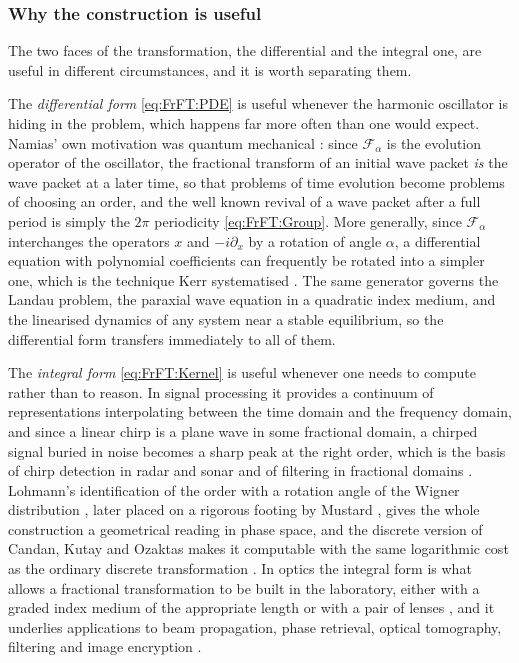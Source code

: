 		\subsubsection{Why the construction is useful}

			The two faces of the transformation, the differential and the integral one, are useful in different circumstances, and it is worth separating them.

			The \emph{differential form} \eqref{eq:FrFT:PDE} is useful whenever the harmonic oscillator is hiding in the problem, which happens far more often than one would expect. Namias' own motivation was quantum mechanical \citep{namias1980fractional}: since $\mathcal{F}_{\alpha}$ is the evolution operator of the oscillator, the fractional transform of an initial wave packet \textit{is} the wave packet at a later time, so that problems of time evolution become problems of choosing an order, and the well known revival of a wave packet after a full period is simply the $2\pi$ periodicity \eqref{eq:FrFT:Group}. More generally, since $\mathcal{F}_{\alpha}$ interchanges the operators $x$ and $-i\partial_{x}$ by a rotation of angle $\alpha$, a differential equation with polynomial coefficients can frequently be rotated into a simpler one, which is the technique Kerr systematised \citep{kerr1988namias}. The same generator governs the Landau problem, the paraxial wave equation in a quadratic index medium, and the linearised dynamics of any system near a stable equilibrium, so the differential form transfers immediately to all of them.

			The \emph{integral form} \eqref{eq:FrFT:Kernel} is useful whenever one needs to compute rather than to reason. In signal processing it provides a continuum of representations interpolating between the time domain and the frequency domain, and since a linear chirp is a plane wave in some fractional domain, a chirped signal buried in noise becomes a sharp peak at the right order, which is the basis of chirp detection in radar and sonar and of filtering in fractional domains \citep{almeida1994fractional, sejdic2011fractional}. Lohmann's identification of the order with a rotation angle of the Wigner distribution \citep{lohmann1993image}, later placed on a rigorous footing by Mustard \citeyearpar{mustard1996fractional}, gives the whole construction a geometrical reading in phase space, and the discrete version of Candan, Kutay and Ozaktas \citeyearpar{candan2000discrete} makes it computable with the same logarithmic cost as the ordinary discrete transformation \citep{cooley1965algorithm}. In optics the integral form is what allows a fractional transformation to be built in the laboratory, either with a graded index medium of the appropriate length \citep{mendlovic1993fractional, ozaktas1993fractional} or with a pair of lenses \citep{lohmann1993image}, and it underlies applications to beam propagation, phase retrieval, optical tomography, filtering and image encryption \citep{ozaktas2001fractional}.

